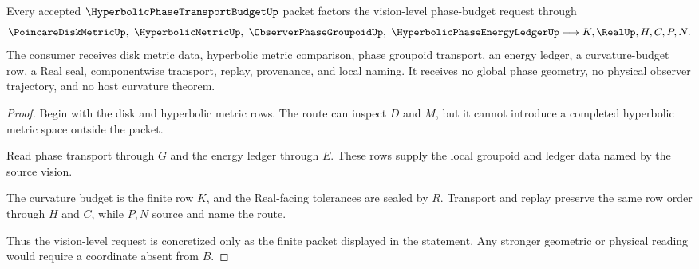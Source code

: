\begin{theorem}
\label{thm:hyperbolic-phase-transport-budget-vision-route}
Every accepted $\HyperbolicPhaseTransportBudgetUp$ packet factors the vision-level phase-budget request through
$$
\PoincareDiskMetricUp,\ \HyperbolicMetricUp,\ \ObserverPhaseGroupoidUp,\ \HyperbolicPhaseEnergyLedgerUp
\longmapsto
K,\RealUp,H,C,P,N .
$$
The consumer receives disk metric data, hyperbolic metric comparison, phase groupoid transport, an energy ledger, a curvature-budget row, a Real seal, componentwise transport, replay, provenance, and local naming. It receives no global phase geometry, no physical observer trajectory, and no host curvature theorem.
\end{theorem}
\begin{proof}
Begin with the disk and hyperbolic metric rows. The route can inspect $D$ and $M$, but it cannot introduce a completed hyperbolic metric space outside the packet.

Read phase transport through $G$ and the energy ledger through $E$. These rows supply the local groupoid and ledger data named by the source vision.

The curvature budget is the finite row $K$, and the Real-facing tolerances are sealed by $R$. Transport and replay preserve the same row order through $H$ and $C$, while $P,N$ source and name the route.

Thus the vision-level request is concretized only as the finite packet displayed in the statement. Any stronger geometric or physical reading would require a coordinate absent from $B$.
\end{proof}



